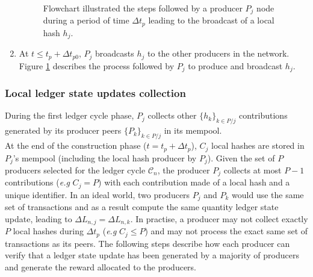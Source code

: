 \begin{enumerate}
\begin{figure}[H]
\label{fig:LLSU}
\caption{\label{fig:LLSU} Flowchart illustrated the steps followed by a producer $P_j$ node during a period of time $\Delta t_{p}$ leading to the broadcast of a local hash $h_j$.}
\end{figure}
\item At $t \leq t_p + \Delta t_{p0}$, $P_j$ broadcasts $h_j$ to the other producers in the network. Figure \ref{fig:LLSU} describes the process followed by $P_j$ to produce and broadcast $h_j$.  
\end{enumerate}

\subsubsection{Local ledger state updates collection}

During the first ledger cycle phase, $P_j$ collects other $\{h_k\}_{k \in P/j}$ contributions generated by its producer peers $\{P_k\}_{k \in P/j}$ in its mempool. \\

At the end of the construction phase ($t = t_p + \Delta t_{p}$), $C_j$ local hashes are stored in $P_j$'s mempool (including the local hash producer by $P_j$). Given the set of $P$ producers selected for the ledger cycle $\mathcal{C}_n$, the producer $P_j$ collects at most $P - 1$ contributions (\textit{e.g} $C_j = P$) with each contribution made of a local hash and a unique identifier. In an ideal world, two producers $P_j$ and $P_k$ would use the same set of transactions and as a result compute the same quantity ledger state update, leading to $\Delta L_{n,j} = \Delta L_{n,k}$. In practise, a producer may not collect exactly $P$ local hashes during $\Delta t_{p}$  (\textit{e.g} $C_j \leq P$) and may not process the exact same set of transactions as its peers. The following steps describe how each producer can verify that a ledger state update has been generated by a majority of producers and generate the reward allocated to the producers. 

